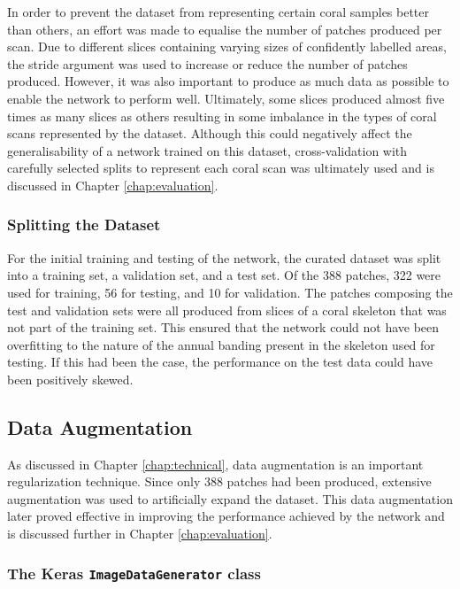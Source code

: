 In order to prevent the dataset from representing certain coral samples better than others, an effort was made to equalise the number of patches produced per scan. Due to different slices containing varying sizes of confidently labelled areas, the stride argument was used to increase or reduce the number of patches produced. However, it was also important to produce as much data as possible to enable the network to perform well. Ultimately, some slices produced almost five times as many slices as others resulting in some imbalance in the types of coral scans represented by the dataset. Although this could negatively affect the generalisability of a network trained on this dataset, cross-validation with carefully selected splits to represent each coral scan was ultimately used and is discussed in Chapter \ref{chap:evaluation}.

\subsubsection{Splitting the Dataset}

For the initial training and testing of the network, the curated dataset was split into a training set, a validation set, and a test set. Of the 388 patches, 322 were used for training, 56 for testing, and 10 for validation. The patches composing the test and validation sets were all produced from slices of a coral skeleton that was not part of the training set. This ensured that the network could not have been overfitting to the nature of the annual banding present in the skeleton used for testing. If this had been the case, the performance on the test data could have been positively skewed.

\subsection{Data Augmentation}

As discussed in Chapter \ref{chap:technical}, data augmentation is an important regularization technique. Since only 388 patches had been produced, extensive augmentation was used to artificially expand the dataset. This data augmentation later proved effective in improving the performance achieved by the network and is discussed further in Chapter \ref{chap:evaluation}.

\subsubsection{The Keras \texttt{ImageDataGenerator} class}

